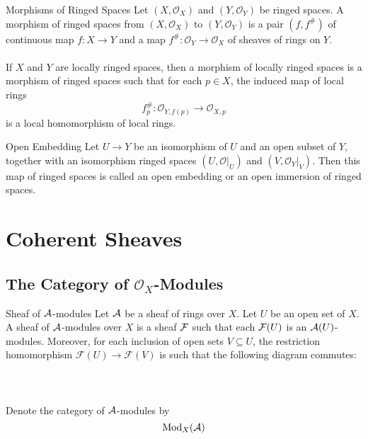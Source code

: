 \documentclass[a4paper]{article}
\begin{document}
\begin{defn}{Morphisms of Ringed Spaces}{} Let $(X,\mathcal{O}_X)$ and $(Y,\mathcal{O}_Y)$ be ringed spaces. A morphism of ringed spaces from $(X,\mathcal{O}_X)$ to $(Y,\mathcal{O}_Y)$ is a pair $(f,f^\#)$ of continuous map $f:X\to Y$ and a map $f^\#:\mathcal{O}_Y\to\mathcal{O}_X$ of sheaves of rings on $Y$. \\~\\
If $X$ and $Y$ are locally ringed spaces, then a morphism of locally ringed spaces is a morphism of ringed spaces such that for each $p\in X$, the induced map of local rings $$f_p^\#:\mathcal{O}_{Y,f(p)}\to\mathcal{O}_{X,p}$$ is a local homomorphism of local rings. 
\end{defn}

\begin{defn}{Open Embedding}{} Let $U\to Y$ be an isomorphism of $U$ and an open subset of $Y$, together with an isomorphism ringed spaces $(U,\mathcal{O}|_U)$ and $(V,\mathcal{O}_Y|_V)$. Then this map of ringed spaces is called an open embedding or an open immersion of ringed spaces. 
\end{defn}

\pagebreak
\section{Coherent Sheaves}
\subsection{The Category of $\mathcal{O}_X$-Modules}
\begin{defn}{Sheaf of $\mathcal{A}$-modules}{} Let $\mathcal{A}$ be a sheaf of rings over $X$. Let $U$ be an open set of $X$. A sheaf of $\mathcal{A}$-modules over $X$ is a sheaf $\mathcal{F}$ such that each $\mathcal{F}(U)$ is an $\mathcal{A}(U)$-modules. Moreover, for each inclusion of open sets $V\subseteq U$, the restriction homomorphism $\mathcal{F}(U)\to\mathcal{F}(V)$ is such that the following diagram commutes: \\~\\
\\~\\
Denote the category of $\mathcal{A}$-modules by $$\text{Mod}_X(\mathcal{A})$$
\end{defn}
\end{document}
